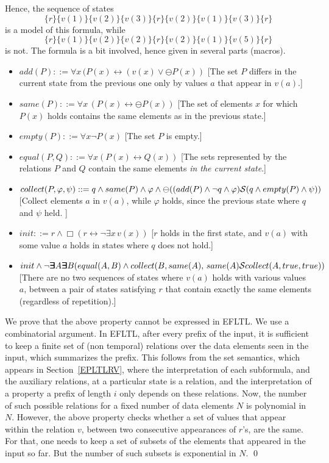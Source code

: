 \documentclass{llncs}
\newcommand{\Exists}{\bm{\exists}\kern-0.6em\bm{\exists}}
\begin{document}
Hence, the sequence of states 
\[ \{ r \} \{ v(1) \}  \{ v(2) \} \{ v(3) \}  \{ r\}  \{ v(2) \}  \{  v(1) \}  \{  v(3) \} \{  r \} \] is a model of this formula, while \[ \{ r \} \{ v(1) \}  \{ v(2) \}  \{ v(2) \}  \{ r\}  \{ v(2) \}  \{  v(1) \}  \{  v(5) \}  \{  r \}\] is not.
The formula is a bit involved, hence given in several parts (macros).
\begin{itemize}
\item $add(P) ::= \forall x \, (P(x) \leftrightarrow (v(x) \vee \ominus P(x))$ [The set $P$ differs in the current state from the previous one only by values $a$ that appear in $v(a)$.]
\item $same(P) ::= \forall x \, (P(x) \leftrightarrow \ominus P(x))$ 
[The set of elements $x$ for which
$P (x)$ holds
contains the same elements as in the previous state.]
\item $empty (P) ::= \forall x \neg P(x)$ [The set $P$ is empty.]
\item $equal (P,Q) ::= \forall x (P(x) \leftrightarrow Q(x))$ 
[The sets represented by the relations
$P$ and $Q$ contain the same elements {\em in the current state}.]
\item $collect(P, \varphi, \psi) ::=
       q \wedge same(P) \wedge \varphi \wedge 
       \ominus ((add(P)\wedge \neg q \wedge \varphi) {\cal S} (q \wedge empty(P) \wedge \psi))$  [Collect elements $a$ in $v(a)$, while $\varphi$ holds, 
       since the previous state where $q$ 
       and $\psi$ held. ]
\item $init ::= r \wedge \Box (r \leftrightarrow \neg \exists x \, v(x))$ [$r$ holds in the first state, and $v(a)$ with some value $a$ holds in states where $q$ does not hold.]
\item $init \wedge \neg \Exists A \Exists B (equal (A, B) \wedge \\
collect(B, same(A),\, same(A) \since collect(A, true, true))$
[There are no two sequences of states where $v(a)$ holds
with various values $a$, between a pair of states satisfying $r$ that contain exactly the same elements (regardless of repetition).]
\end{itemize}
We prove that the above property cannot be expressed in EFLTL.
We use a combinatorial argument.
In EFLTL, after every prefix of the input, it is
sufficient to keep a finite set of (non temporal) relations over the
data elements seen in the input, which
summarizes the prefix. This follows from the set
semantics, which appears in Section~\ref{EPLTLRV}, 
where the interpretation of
each subformula, and the auxiliary relations,
at a particular state is a relation, and the interpretation 
of a property a prefix of length $i$ only depends on
these relations. Now, the number of such possible relations
for a fixed number of data elements $N$ is polynomial
in $N$. However, the above property checks whether
a set of values that appear within the relation $v$, between two consecutive appearances
of $r$'s, are the same. For that, one needs to keep a set of
subsets of the elements that appeared in the input so far. 
But the number of such subsets is exponential in $N$. \qed
\end{document}
